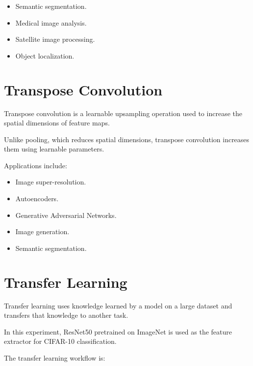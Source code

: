 \documentclass[12pt,a4paper]{article}
\begin{document}
\begin{itemize}
    \item Semantic segmentation.
    \item Medical image analysis.
    \item Satellite image processing.
    \item Object localization.
\end{itemize}


\section{Transpose Convolution}

Transpose convolution is a learnable upsampling operation used to increase the spatial dimensions of feature maps.

Unlike pooling, which reduces spatial dimensions, transpose convolution increases them using learnable parameters.

Applications include:

\begin{itemize}
    \item Image super-resolution.
    \item Autoencoders.
    \item Generative Adversarial Networks.
    \item Image generation.
    \item Semantic segmentation.
\end{itemize}


\section{Transfer Learning}

Transfer learning uses knowledge learned by a model on a large dataset and transfers that knowledge to another task.

In this experiment, ResNet50 pretrained on ImageNet is used as the feature extractor for CIFAR-10 classification.

The transfer learning workflow is:
\end{document}
